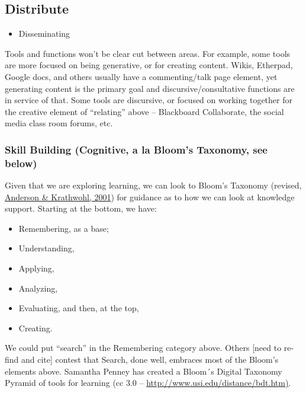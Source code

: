 \subsection{Distribute}

\begin{itemize}
\item
  Disseminating
\end{itemize}
Tools and functions won't be clear cut between areas. For example, some
tools are more focused on being generative, or for creating content.
Wikis, Etherpad, Google docs, and others usually have a commenting/talk
page element, yet generating content is the primary goal and
discursive/consultative functions are in service of that. Some tools are
discursive, or focused on working together for the creative element of
``relating'' above -- Blackboard Collaborate, the social media class
room forums, etc.

\subsubsection{Skill Building (Cognitive, a la Bloom's Taxonomy, see
below)}

Given that we are exploring learning, we can look to Bloom's Taxonomy
(revised, \href{\#anderson}{Anderson \& Krathwohl, 2001}) for guidance
as to how we can look at knowledge support. Starting at the bottom, we
have:

\begin{itemize}
\item
  Remembering, as a base;
\end{itemize}
\begin{itemize}
\item
  Understanding,
\end{itemize}
\begin{itemize}
\item
  Applying,
\end{itemize}
\begin{itemize}
\item
  Analyzing,
\end{itemize}
\begin{itemize}
\item
  Evaluating, and then, at the top,
\end{itemize}
\begin{itemize}
\item
  Creating.
\end{itemize}
We could put ``search'' in the Remembering category above. Others
{[}need to re-find and cite{]} contest that Search, done well, embraces
most of the Bloom's elements above. Samantha Penney has created a
Bloom´s Digital Taxonomy Pyramid of tools for learning (cc 3.0 --
\href{http://www.usi.edu/distance/bdt.htm)}{http://www.usi.edu/distance/bdt.htm)}.

